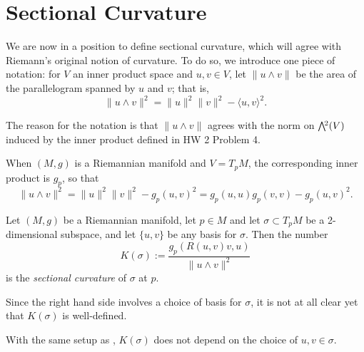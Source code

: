 
\section{Sectional Curvature}
\label{sec:sectional curvature}


We are now in a position to define sectional curvature, which will agree with Riemann's original notion of curvature. To do so, we introduce one piece of notation: for $V$ an inner product space and $u,v \in V$, let $\|u \wedge v\|$ be the area of the parallelogram spanned by $u$ and $v$; that is,
\begin{equation}\label{eq:parallelogram area}
	\|u \wedge v\|^2 = \|u\|^2\|v\|^2 - \langle u, v \rangle^2.
\end{equation}

\begin{remark}
	The reason for the notation is that $\|u \wedge v\|$ agrees with the norm on $\ext{2}(V)$ induced by the inner product defined in HW 2 Problem 4.
\end{remark}

\begin{remark}
	When $(M,g)$ is a Riemannian manifold and $V = T_pM$, the corresponding inner product is $g_p$, so that
	\[
		\|u \wedge v\|^2 = \|u\|^2 \|v\|^2 -g_p(u,v)^2 = g_p(u,u) g_p(v,v) - g_p(u,v)^2.
	\]
\end{remark}

\begin{definition}\label{def:sectional curvature}
	Let $(M,g)$ be a Riemannian manifold, let $p \in M$ and let $\sigma \subset T_pM$ be a 2-dimensional subspace, and let $\{u,v\}$ be any basis for $\sigma$. Then the number
	\[
		K(\sigma):= \frac{g_p(R(u,v)v,u)}{\|u \wedge v\|^2}
	\]
	is the \emph{sectional curvature} of $\sigma$ at $p$.
\end{definition}

Since the right hand side involves a choice of basis for $\sigma$, it is not at all clear yet that $K(\sigma)$ is well-defined.

\begin{proposition}\label{prop:sectional curvature well defined}
	With the same setup as , $K(\sigma)$ does not depend on the choice of $u,v \in \sigma$.
\end{proposition}

